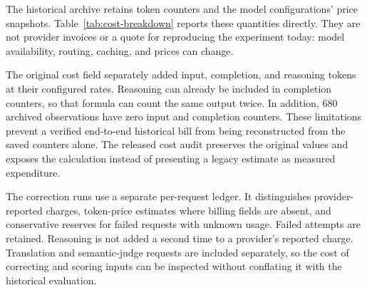 \documentclass{article}
\begin{document}
The historical archive retains token counters and the model configurations'
price snapshots. Table~\ref{tab:cost-breakdown} reports these quantities
directly. They are not provider invoices or a quote for reproducing the
experiment today: model availability, routing, caching, and prices can change.

The original cost field separately added input, completion, and reasoning
tokens at their configured rates. Reasoning can already be included in
completion counters, so that formula can count the same output twice.
In addition, 680 archived observations have zero input and completion
counters. These limitations prevent a verified end-to-end historical bill
from being reconstructed from the saved counters alone. The released cost
audit preserves the original values and exposes the calculation instead
of presenting a legacy estimate as measured expenditure.



The correction runs use a separate per-request ledger. It distinguishes
provider-reported charges, token-price estimates where billing fields are
absent, and conservative reserves for failed requests with unknown usage.
Failed attempts are retained. Reasoning is not added a second time to a
provider's reported charge. Translation and semantic-judge requests are
included separately, so the cost of correcting and scoring inputs can be
inspected without conflating it with the historical evaluation.
\end{document}
